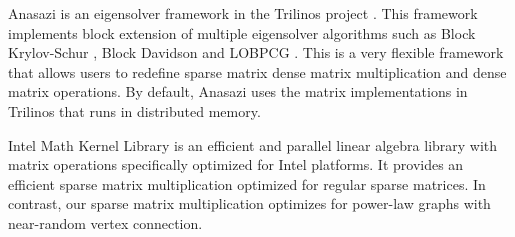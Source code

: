 Anasazi \cite{anasazi} is an eigensolver framework in the Trilinos project
\cite{trilinos}. This framework implements block extension of multiple
eigensolver algorithms such as Block Krylov-Schur \cite{krylovschur},
Block Davidson \cite{Arbenz05} and LOBPCG \cite{Arbenz05}.
This is a very flexible framework
that allows users to redefine sparse matrix dense matrix multiplication and
dense matrix operations. By default, Anasazi uses the matrix implementations
in Trilinos that runs in distributed memory.

Intel Math Kernel Library \cite{mkl} is an efficient and parallel linear
algebra library with matrix operations specifically optimized for Intel
platforms. It provides an efficient sparse matrix multiplication optimized
for regular sparse matrices. In contrast, our sparse matrix multiplication
optimizes for power-law graphs with near-random vertex connection.
